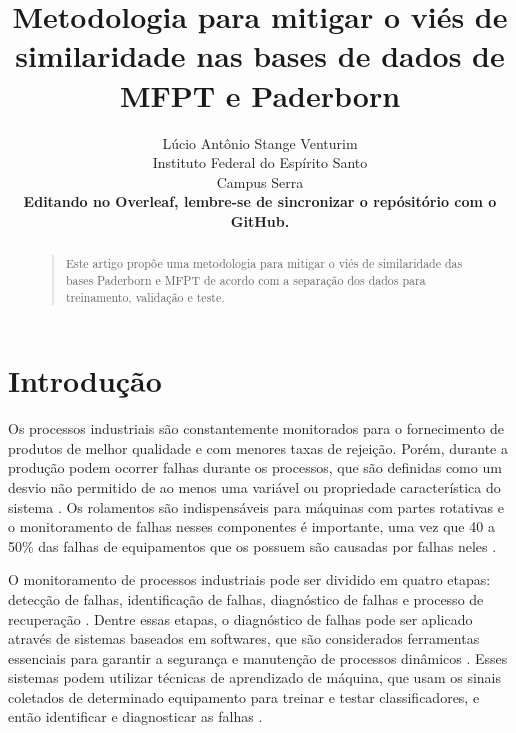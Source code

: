 \documentclass[letterpaper]{article}
\begin{document}
%
\title{Metodologia para mitigar o viés de similaridade nas bases de dados de MFPT e Paderborn}
\author{Lúcio Antônio Stange Venturim\\
Instituto Federal do Espírito Santo\\
Campus Serra\\
\textbf{Editando no Overleaf, lembre-se de sincronizar
o repósitório com o GitHub.}
}
\maketitle
\begin{abstract}
\begin{quote}
Este artigo propõe uma metodologia para mitigar o viés de similaridade das bases Paderborn e MFPT de acordo com a separação dos dados para treinamento, validação e teste.
\end{quote}
\end{abstract}

\section{Introdução}

Os processos industriais são constantemente monitorados para o fornecimento de produtos de melhor qualidade e com menores taxas de rejeição. Porém, durante a produção podem ocorrer falhas durante os processos, que são definidas como um desvio não permitido de ao menos uma variável ou propriedade característica do sistema \cite{isermann1997trends}. Os rolamentos são indispensáveis para máquinas com partes rotativas e o monitoramento de falhas nesses componentes é importante, uma vez que 40 a 50\% das falhas de equipamentos que os possuem são causadas por falhas neles \cite{nandi2005condition}.

O monitoramento de processos industriais pode ser dividido em quatro etapas: detecção de falhas, identificação de falhas, diagnóstico de falhas e processo de recuperação \cite{chiang2000fault}. Dentre essas etapas, o diagnóstico de falhas pode ser aplicado através de sistemas baseados em softwares, que são considerados ferramentas essenciais para garantir a segurança e manutenção de processos dinâmicos \cite{chiang2000fault}. Esses sistemas podem utilizar técnicas de aprendizado de máquina, que usam os sinais coletados de determinado equipamento para treinar e testar classificadores, e então identificar e diagnosticar as falhas \cite{rauber2020experimental}.
\end{document}
